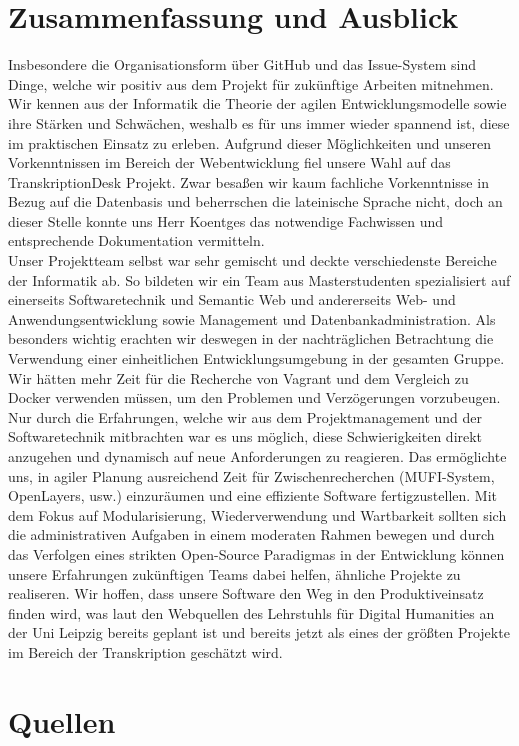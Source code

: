 \documentclass{article}
\begin{document}
\section{Zusammenfassung und Ausblick}
Insbesondere die Organisationsform über GitHub und das Issue-System sind Dinge, welche wir positiv aus dem Projekt für zukünftige Arbeiten mitnehmen.\\
Wir kennen aus der Informatik die Theorie der agilen Entwicklungsmodelle sowie ihre Stärken und Schwächen, weshalb es für uns immer wieder spannend ist, diese im praktischen Einsatz zu erleben.
Aufgrund dieser Möglichkeiten und unseren Vorkenntnissen im Bereich der Webentwicklung fiel unsere Wahl auf das TranskriptionDesk Projekt.
Zwar besaßen wir kaum fachliche Vorkenntnisse in Bezug auf die Datenbasis und beherrschen die lateinische Sprache nicht, doch an dieser Stelle konnte uns Herr Koentges das notwendige Fachwissen und entsprechende Dokumentation vermitteln.\\
Unser Projektteam selbst war sehr gemischt und deckte verschiedenste Bereiche der Informatik ab. So bildeten wir ein Team aus Masterstudenten 
spezialisiert auf einerseits Softwaretechnik und Semantic Web und andererseits Web- und Anwendungsentwicklung sowie Management und Datenbankadministration.
Als besonders wichtig erachten wir deswegen in der nachträglichen Betrachtung die Verwendung einer einheitlichen Entwicklungsumgebung in der gesamten Gruppe. 
Wir hätten mehr Zeit für die Recherche von Vagrant und dem Vergleich zu Docker verwenden müssen, um den Problemen und Verzögerungen vorzubeugen.\\
Nur durch die Erfahrungen, welche wir aus dem Projektmanagement und der Softwaretechnik mitbrachten war es uns möglich, diese Schwierigkeiten direkt anzugehen und dynamisch auf neue Anforderungen zu reagieren.
Das ermöglichte uns, in agiler Planung ausreichend Zeit für Zwischenrecherchen (MUFI-System, OpenLayers, usw.) einzuräumen und eine effiziente Software fertigzustellen.
Mit dem Fokus auf Modularisierung, Wiederverwendung und Wartbarkeit sollten sich die administrativen Aufgaben in einem moderaten Rahmen bewegen und 
durch das Verfolgen eines strikten Open-Source Paradigmas in der Entwicklung können unsere Erfahrungen zukünftigen Teams dabei helfen, ähnliche Projekte zu realiseren.
Wir hoffen, dass unsere Software den Weg in den Produktiveinsatz finden wird, was laut den Webquellen des Lehrstuhls für Digital Humanities an der Uni Leipzig bereits geplant ist und bereits jetzt als eines der größten Projekte im Bereich der Transkription geschätzt wird.

\section*{Quellen}
  \printbibliography[%
    heading=bibintoc, %
  ]
\end{document}
